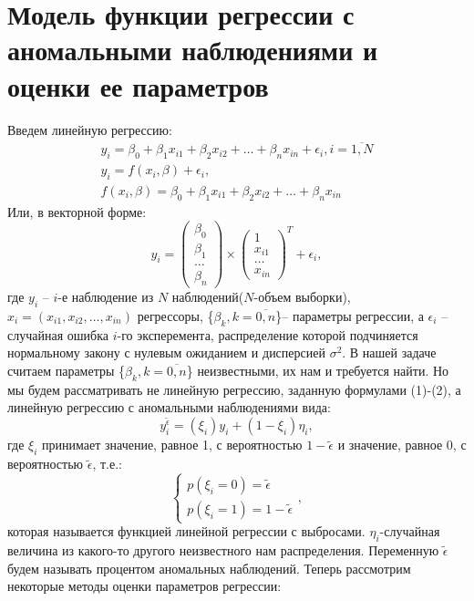 \documentclass[12pt]{article}
\begin{document}
\section{Модель функции регрессии с аномальными наблюдениями и оценки ее параметров}
Введем линейную регрессию:\hfill\break
\begin{eqnarray}
    y_i=\beta_0+\beta_1 x_{i1}+\beta_2 x_{i2}+\dots+\beta_n x_{in}+\epsilon_i, i=\overline{1,N}\\
    \nonumber y_i= f(x_i,\beta)+\epsilon_i,\\
    \nonumber f(x_i,\beta)=\beta_0+\beta_1 x_{i1}+\beta_2 x_{i2}+\dots+\beta_n x_{in}
\end{eqnarray}
Или, в векторной форме:
\begin{equation}
    y_i= 
    \begin{pmatrix}
        \beta_0\\
        \beta_1\\
        \dots\\
        \beta_n
    \end{pmatrix}\times
    \begin{pmatrix}
        1\\
        x_{i1}\\
        \dots\\
        x_{in}
    \end{pmatrix}^{T}+ \epsilon_i,
\end{equation}
где $y_i$ -- $i$-е наблюдение из $N$ наблюдений($N$-объем выборки), $x_i=(x_{i1},x_{i2},\dots,x_{in})$ регрессоры, \{$\beta_k, k=\overline{0,n}$\}-- параметры регрессии, а $\epsilon_i$ -- случайная ошибка $i$-го эксперемента, распределение которой подчиняется нормальному закону с нулевым ожиданием и дисперсией $\sigma^2$.\hfill\break
В нашей задаче считаем параметры \{$\beta_k, k=\overline{0,n}$\} неизвестными, их нам и требуется найти.\hfill\break
Но мы будем рассматривать не линейную регрессию, заданную формулами (1)-(2), а линейную регрессию с аномальными наблюдениями вида:
\begin{equation}
    y_i^{\widetilde{\epsilon}}=(\xi_i)y_i+ (1-\xi_i)\eta_i,
\end{equation}
где $\xi_i$ принимает значение, равное 1, с вероятностью $1-\widetilde{\epsilon}$ и значение, равное 0, с вероятностью $\widetilde{\epsilon}$, т.е.:
\begin{equation}
    \begin{cases}
        p(\xi_i=0)=\widetilde{\epsilon}\\
        p(\xi_i=1)=1-\widetilde{\epsilon}
    \end{cases},
\end{equation}
которая называется функцией линейной регрессии с выбросами. $\eta_i$-случайная величина из какого-то другого неизвестного нам распределения. Переменную $\widetilde{\epsilon}$ будем называть процентом аномальных наблюдений.\hfill\break
Теперь рассмотрим некоторые методы оценки параметров регрессии:
\end{document}
